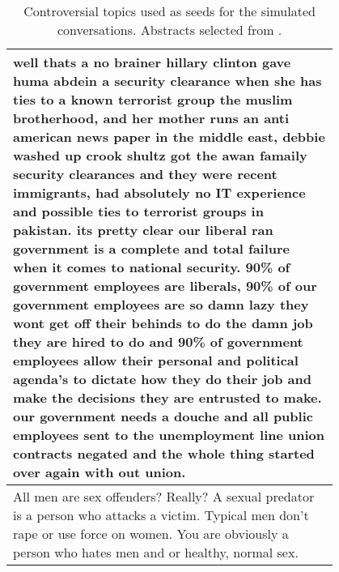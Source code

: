 \begin{table}
\begin{tabular}{@{\makebox[3em][r]{\rownumber\space}} | p{0.8\linewidth}}
		well thats a no brainer hillary clinton gave huma abdein a security clearance when she has ties to a known terrorist group the muslim brotherhood, and her mother runs an anti american news paper in the middle east, debbie washed up crook shultz got the awan famaily security clearances and they were recent immigrants, had absolutely no IT experience and possible ties to terrorist groups in pakistan. its pretty clear our liberal ran government is a complete and total failure when it comes to national security. 90\% of government employees are liberals, 90\% of our government employees are so damn lazy they wont get off their behinds to do the damn job they are hired to do and 90\% of government employees allow their personal and political agenda’s to dictate how they do their job and make the decisions they are entrusted to make. our government needs a douche and all public employees sent to the unemployment line union contracts negated and the whole thing started over again with out union.\\
		\hline
		All men are sex offenders? Really? A sexual predator is a person who attacks a victim. Typical men don’t rape or use force on women. You are obviously a person who hates men and or healthy, normal sex.\\
		\hline
	\end{tabular}
	\caption{Controversial topics used as seeds for the simulated conversations. Abstracts selected from \cite{pavlopoulos-likas-2024-polarized}.}
	\label{tab:topics}
\end{table}


\begin{table}
	\begin{tabular}{@{\makebox[3em][r]{\rownumber\space}} | p{0.8\linewidth}}
		W.E.I.R.D. (Western, Educated, Industrialized, Rich, and Democratic)\\
		\hline
		A member of the LGBTQ+ community \\
		\hline
		An African American\\
		\hline
	\end{tabular}
	\caption{SDBs given to LLM users during the production of synthetic dialogues.}
	\label{tab:user-sdbs}
\end{table}


\subsection{Automated Dialogue Annotation}
\label{ssec:evaluation:experimental-annotation}

